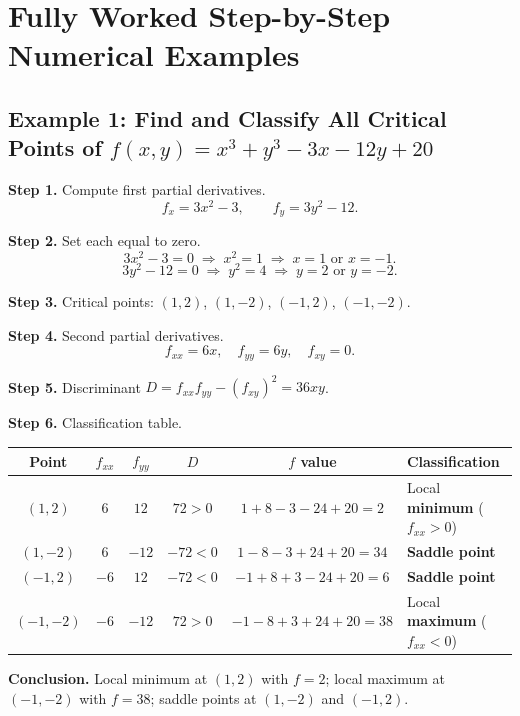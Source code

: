\documentclass[12pt,a4paper]{article}
\begin{document}
\section{Fully Worked Step-by-Step Numerical Examples}

\subsection*{Example 1: Find and Classify All Critical Points of $f(x,y) = x^{3} + y^{3} - 3x - 12y + 20$}

\textbf{Step 1.} Compute first partial derivatives.
\[
  f_x = 3x^{2} - 3, \qquad f_y = 3y^{2} - 12.
\]

\textbf{Step 2.} Set each equal to zero.
\[
  3x^{2} - 3 = 0 \;\Rightarrow\; x^{2} = 1 \;\Rightarrow\; x = 1 \text{ or } x = -1.
\]
\[
  3y^{2} - 12 = 0 \;\Rightarrow\; y^{2} = 4 \;\Rightarrow\; y = 2 \text{ or } y = -2.
\]

\textbf{Step 3.} Critical points: $(1,2)$, $(1,-2)$, $(-1,2)$, $(-1,-2)$.

\textbf{Step 4.} Second partial derivatives.
\[
  f_{xx} = 6x, \quad f_{yy} = 6y, \quad f_{xy} = 0.
\]

\textbf{Step 5.} Discriminant $D = f_{xx}f_{yy} - (f_{xy})^{2} = 36xy$.

\textbf{Step 6.} Classification table.

\begin{center}
\begin{tabular}{@{}cccccl@{}}
\toprule
Point & $f_{xx}$ & $f_{yy}$ & $D$ & $f$ value & Classification \\
\midrule
$(1,2)$   & $6$  & $12$  & $72 > 0$  & $1+8-3-24+20 = 2$  & Local \textbf{minimum} ($f_{xx}>0$) \\
$(1,-2)$  & $6$  & $-12$ & $-72 < 0$ & $1-8-3+24+20 = 34$ & \textbf{Saddle point} \\
$(-1,2)$  & $-6$ & $12$  & $-72 < 0$ & $-1+8+3-24+20 = 6$ & \textbf{Saddle point} \\
$(-1,-2)$ & $-6$ & $-12$ & $72 > 0$  & $-1-8+3+24+20 = 38$& Local \textbf{maximum} ($f_{xx}<0$) \\
\bottomrule
\end{tabular}
\end{center}

\textbf{Conclusion.} Local minimum at $(1,2)$ with $f = 2$; local maximum at $(-1,-2)$ with $f = 38$; saddle points at $(1,-2)$ and $(-1,2)$.
\end{document}
